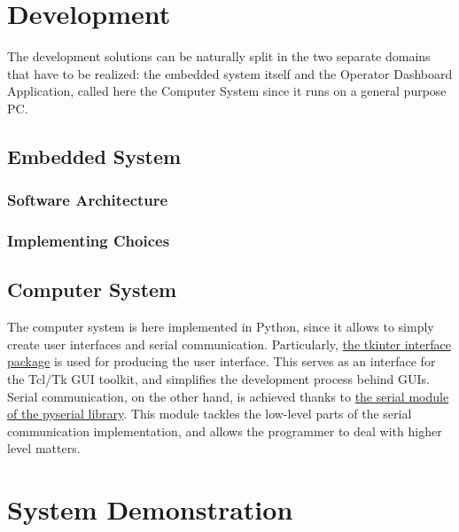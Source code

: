 \documentclass[a4paper,12pt]{report}
\begin{document}
	\chapter{Development}
	The development solutions can be naturally split in the two separate domains that have to be realized: the embedded system itself and the Operator Dashboard Application, called here the Computer System since it runs on a general purpose PC. 
	
	\section{Embedded System}
	
	\subsection{Software Architecture}
	
	\subsection{Implementing Choices}
	
	\section{Computer System}
	The computer system is here implemented in Python, since it allows to simply create user interfaces and serial communication.\newline
	Particularly, \href{https://docs.python.org/3/library/tkinter.html}{the tkinter interface package} is used for producing the user interface. This serves as an interface for the Tcl/Tk GUI toolkit, and simplifies the development process behind GUIs.\newline
	Serial communication, on the other hand, is achieved thanks to \href{https://pyserial.readthedocs.io/en/latest/}{the serial module of the pyserial library}. This module tackles the low-level parts of the serial communication implementation, and allows the programmer to deal with higher level matters.\newline
	
	\chapter{System Demonstration}
	
\end{document}
